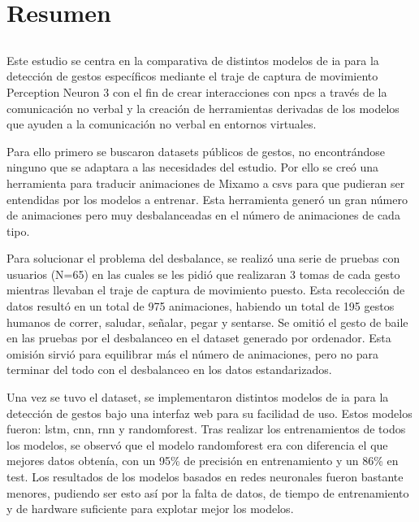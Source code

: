 \chapter*{Resumen}

\section*{\tituloPortadaVal}

Este estudio se centra en la comparativa de distintos modelos de \gls{ia} para la detección de gestos específicos mediante el traje de captura de movimiento Perception Neuron 3 con el fin de crear interacciones con \glspl{npc} a través de la comunicación no verbal y la creación de herramientas derivadas de los modelos que ayuden a la comunicación no verbal en entornos virtuales.

Para ello primero se buscaron datasets públicos de gestos, no encontrándose ninguno que se adaptara a las necesidades del estudio. Por ello se creó una herramienta para traducir animaciones de Mixamo a \glspl{csv} para que pudieran ser entendidas por los modelos a entrenar. Esta herramienta generó un gran número de animaciones pero muy desbalanceadas en el número de animaciones de cada tipo.

Para solucionar el problema del desbalance, se realizó una serie de pruebas con usuarios (N=65) en las cuales se les pidió que realizaran 3 tomas de cada gesto mientras llevaban el traje de captura de movimiento puesto. Esta recolección de datos resultó en un total de 975 animaciones, habiendo un total de 195 gestos humanos de correr, saludar, señalar, pegar y sentarse. Se omitió el gesto de baile en las pruebas por el desbalanceo en el dataset generado por ordenador. Esta omisión sirvió para equilibrar más el número de animaciones, pero no para terminar del todo con el desbalanceo en los datos estandarizados.

Una vez se tuvo el dataset, se implementaron distintos modelos de \gls{ia} para la detección de gestos bajo una interfaz web para su facilidad de uso. Estos modelos fueron: \gls{lstm}, \gls{cnn}, \gls{rnn} y \gls{randomforest}. Tras realizar los entrenamientos de todos los modelos, se observó que el modelo \gls{randomforest} era con diferencia el que mejores datos obtenía, con un 95\% de precisión en entrenamiento y un 86\% en test. Los resultados de los modelos basados en redes neuronales fueron bastante menores, pudiendo ser esto así por la falta de datos, de tiempo de entrenamiento y de hardware suficiente para explotar mejor los modelos.

